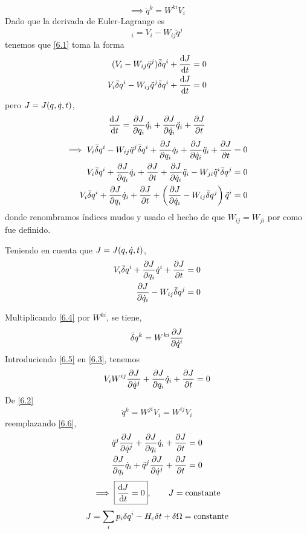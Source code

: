 \begin{equation}\label{6.2}
  \implies \boxed{\ddot{q}^k=W^{ki}V_i}
\end{equation}
Dado que la derivada de Euler-Lagrange es
\begin{equation}
  [L]_i=V_i-W_{ij}\ddot{q}^j
\end{equation}
tenemos que \eqref{6.1} toma la forma
\begin{align}
  (V_i-W_{ij}\ddot{q}^j)\bar{\delta} q^{i}+\dv{J}{t}&=0\\
  V_i\bar{\delta} q^{i}-W_{ij}\ddot{q}^j\bar{\delta} q^{i}+\dv{J}{t}&=0
\end{align}
pero $J=J(q,\dot{q},t)$,
\begin{equation}
  \dv{J}{t}=\pdv{J}{q_i}\dot{q}_i+\pdv{J}{\dot{q}_i}\ddot{q}_i+\pdv{J}{t}
\end{equation}
\begin{align}
  \implies V_i\db q^{i}-W_{ij}\ddot{q}^j\db q^{i}+\pdv{J}{q_i}\qd_i+\pdv{J}{\qd_i}\ddot{q}_i+\pdv{J}{t}&=0\\
  V_i\db q^{i}+\pdv{J}{q_i}\qd_i+\pdv{J}{t}+\pdv{J}{\qd_i}\ddot{q}_i-W_{ji}\ddot{q}^i\db q^{j}&=0\\
   V_i\db q^{i}+\pdv{J}{q_i}\qd_i+\pdv{J}{t}+\l(\pdv{J}{\qd_i}-W_{ij}\db q^j\r)\ddot{q}^{i}&=0
\end{align}
donde renombramos índices mudos y usado el hecho de que $W_{ij}=W_{ji}$ por como fue definido.

Teniendo en cuenta que $J=J(q,\dot{q},t)$,
\begin{align}
  V_i\bar{\delta} q^{i}+\pdv{J}{q_i}\dot{q}^{i}+\pdv{J}{t}&=0 \label{6.3}\\
  \pdv{J}{\dot{q}_i}-W_{ij}\bar{\delta} q^j&=0\label{6.4}
\end{align}

Multiplicando \eqref{6.4} por $W^{ki}$, se tiene,
\begin{equation}\label{6.5}
  \bar{\delta} q^k=W^{ki}\pdv{J}{\dot{q}^{i}}
\end{equation}
Introduciendo \eqref{6.5} en \eqref{6.3}, tenemos
\begin{equation}\label{6.6}
  V_iW^{ij}\pdv{J}{\dot{q}^j}+\pdv{J}{q_i}\dot{q}_i+\pdv{J}{t}=0
\end{equation}
De \eqref{6.2}
\begin{equation}
  \ddot{q}^k=W^{ji}V_i=W^{ij}V_i
\end{equation}
reemplazando \eqref{6.6},
\begin{align}
  \ddot{q}^j\pdv{J}{\dot{q}^j}+\pdv{J}{q_i}\dot{q}_i+\pdv{J}{t}&=0\\
  \pdv{J}{q_i}\dot{q}_i+\ddot{q}^j\pdv{J}{\dot{q}^j}+\pdv{J}{t}&=0
\end{align}
\begin{equation}
  \implies\boxed{ \dv{J}{t}=0},\qquad J=\text{constante}
\end{equation}
\begin{equation}
  J=\sum_i p_i\delta q^{i}-H_c\delta t+\delta\Omega=\text{constante}
\end{equation}

